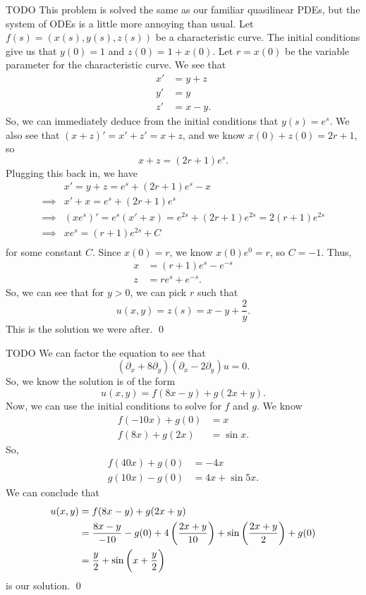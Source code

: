 \documentclass{article}
\renewcommand{\d}{\partial}
\begin{document}
\newpage
{} TODO \tri
\hop
\solution
This problem is solved the same as our familiar quasilinear PDEs, but the system of ODEs is a little more annoying than usual. Let $f(s) = (x(s), y(s),z(s))$ be a characteristic curve. The initial conditions give us that $y(0) = 1$ and $z(0) = 1 + x(0)$. Let $r = x(0)$ be the variable parameter for the characteristic curve. 
\hop 
We see that 
\begin{align*}
    x' &= y + z \\
    y' &= y\\
    z' &= x - y.
\end{align*}
So, we can immediately deduce from the initial conditions that $y(s) = e^s$. We also see that $(x+z)' = x'+z' = x+z$, and we know $x(0)+z(0) = 2r +1$, so \[x+z = (2r+1)e^s.\] 
Plugging this back in, we have 
\begin{align*}
    & x' = y+z = e^s+(2r+1)e^s - x \\ 
    \implies & x' + x = e^s + (2r+1)e^s \\
    \implies & (xe^{s})' = e^s(x' + x) = e^{2s} + (2r+1)e^{2s}= 2(r+1)e^{2s} \\
    \implies & xe^s = (r+1)e^{2s} + C\\
\end{align*}
for some constant $C$. Since $x(0) = r$, we know $x(0)e^0 = r$, so $C = -1$. Thus, 
\begin{align*}
    x &= (r+1)e^s - e^{-s}\\
    z &= re^s + e^{-s}.
\end{align*}
So, we can see that for $y > 0$, we can pick $r$ such that 
\[u(x,y) = z(s) = x - y + \frac{2}{y}.\]
This is the solution we were after. \qed


\newpage
{} TODO \tri
\hop
\solution
We can factor the equation to see that 
\[(\d_x+8\d_y)(\d_x-2\d_y)u = 0.\]
So, we know the solution is of the form 
\[u(x,y) = f(8x-y) + g(2x+y).\]
Now, we can use the initial conditions to solve for $f$ and $g$. We know 
\begin{align*}
    f(-10x)+g(0) &= x\\
    f(8x) + g(2x) &= \sin x.
\end{align*}
So, 
\begin{align*}
    f(40x) + g(0) &= -4x \\
    g(10x) - g(0) &= 4x + \sin 5x.
\end{align*}
We can conclude that 
\begin{align*}
    u(x,y) &= f(8x - y) + g(2x + y) \\
    &= \frac{8x-y}{-10} - g(0) + 4\del{\frac{2x+y}{10}} + \sin \del{\frac{2x+y}{2}} + g(0)\\
    &= \frac{y}{2} + \sin\del{x+ \frac{y}{2}}
\end{align*}
is our solution. \qed
\end{document}
